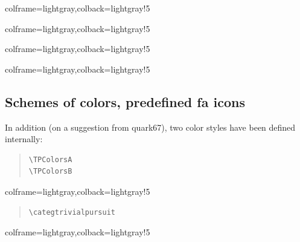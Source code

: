 \documentclass[11pt,a4paper]{ltxdoc}
\begin{document}
\begin{tcblisting}{colframe=lightgray,colback=lightgray!5}
\BoardTrivialPursuit[Rotation=35,Unit=0.5]
\BoardTrivialPursuit[Unit=0.5]
\end{tcblisting}

\begin{tcblisting}{colframe=lightgray,colback=lightgray!5}
\BoardTrivialPursuit[Unit=0.5,Icons=false]
\BoardTrivialPursuit[Unit=0.5,Colors=false]
\end{tcblisting}

\begin{tcblisting}{colframe=lightgray,colback=lightgray!5}
\BoardTrivialPursuit[Unit=0.5,Blank]
\BoardTrivialPursuit[Unit=0.5,Logo=false,Center=false,IconJoker=\faAward]
\end{tcblisting}

\begin{tcblisting}{colframe=lightgray,colback=lightgray!5}
\BoardTrivialPursuit[%
	Jokers=false,%
	ListColors={%
		blue!25,red!25,teal!25,orange!25,gray!50,violet!25},%
	ListIcons={
		\faAddressCard,\faAngleDoubleRight,\faAngry[regular],%
		\faAtom,\faBalanceScaleLeft,\faBell}
]
\end{tcblisting}

\pagebreak

\subsection{Schemes of colors, predefined fa icons}

In addition (on a suggestion from \textsf{quark67}), two color styles have been defined internally:

\begin{quote}
\begin{verbatim}
\TPColorsA
\TPColorsB
\end{verbatim}
\end{quote}

\begin{tcblisting}{colframe=lightgray,colback=lightgray!5}
\BoardTrivialPursuit[Unit=0.5,ListColors=\TPColorsA]
\BoardTrivialPursuit[Unit=0.5,ListColors=\TPColorsB]
\end{tcblisting}

\begin{quote}
\begin{verbatim}
\categtrivialpursuit
\end{verbatim}
\end{quote}

\begin{tcblisting}{colframe=lightgray,colback=lightgray!5}
\BoardTrivialPursuit%
	[ListIcons=\categtrivialpursuit,ListColors=\TPColorsB,IconJoker=\faDice]
\end{tcblisting}
\end{document}
